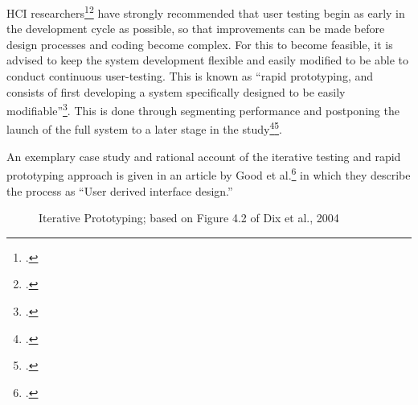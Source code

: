 HCI researchers\footcite{Cox2008}\footcite{Lazar2010} have strongly recommended that user testing begin as early in the development cycle as possible, so that improvements can be made before design processes and coding become complex. For this to become feasible, it is advised to keep the system development flexible and easily modified to be able to conduct continuous user-testing. This is known as ``rapid prototyping, and consists of first developing a system specifically designed to be easily modifiable''\footcite{Wania2006}. This is done through segmenting performance and postponing the launch of the full system to a later stage in the study\footcite{Dix2004}\footcite{Georges2004}.

An exemplary case study and rational account of the iterative testing and rapid prototyping approach is given in an article by Good et al.\footcite{Cox2008} in which they describe the process as ``User derived interface design.''

\begin{figure} 
    \centering
    \caption{Iterative Prototyping; based on Figure 4.2 of Dix et al., 2004}
    \label{fig:idpdiagram2}
\end{figure}

